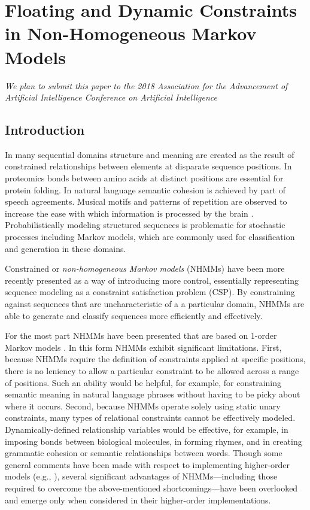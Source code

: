 \documentclass[phd,electronic,oneside,twosidetoc,letterpaper,chaptercenter,parttop,lol,lof,lot]{byumsphd}
\begin{document}
\chapter{Floating and Dynamic Constraints in Non-Homogeneous Markov Models}

\emph{We plan to submit this paper to the 2018 Association for the Advancement of Artificial Intelligence Conference on Artificial Intelligence}

\section{Introduction}

In many sequential domains structure and meaning are created as the result of constrained relationships between elements at disparate sequence positions. In proteomics bonds between amino acids at distinct positions are essential for protein folding. In natural language semantic cohesion is achieved by part of speech agreements. Musical motifs and patterns of repetition are observed to increase the ease with which information is processed by the brain \cite{Nunes2014}. Probabilistically modeling structured sequences is problematic for stochastic processes including Markov models, which are commonly used for classification and generation in these domains. 

Constrained or \textit{non-homogeneous Markov models} (NHMMs) \cite{pachet2011finite} have been more recently presented as a way of introducing more control, essentially representing sequence modeling as a constraint satisfaction problem (CSP). By constraining against sequences that are uncharacteristic of a a particular domain, NHMMs are able to generate and classify sequences more efficiently and effectively. 

For the most part NHMMs have been presented that are based on 1-order Markov models \cite{barbieri2012markov,roy2013enforcing,papadopoulos2015exact}. In this form NHMMs exhibit significant limitations. First, because NHMMs require the definition of constraints applied at specific positions, there is no leniency to allow a particular constraint to be allowed across a range of positions. Such an ability would be helpful, for example, for constraining semantic meaning in natural language phrases without having to be picky about where it occurs. Second, because NHMMs operate solely using static unary constraints, many types of relational constraints cannot be effectively modeled. Dynamically-defined relationship variables would be effective, for example, in imposing bonds between biological molecules, in forming rhymes, and in creating grammatic cohesion or semantic relationships between words. Though some general comments have been made with respect to implementing higher-order models (e.g., \cite{pachet2011finite}), several significant advantages of NHMMs---including those required to overcome the above-mentioned shortcomings---have been overlooked and emerge only when considered in their higher-order implementations.
\end{document}
